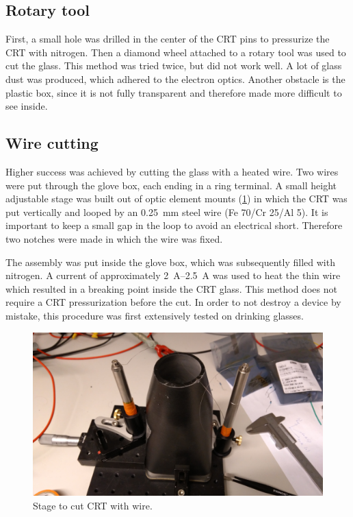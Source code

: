 \subsection{Rotary tool}
\label{subsec:Rotary tool}

First, a small hole was drilled in the center of the CRT pins to pressurize the CRT with nitrogen. Then a diamond wheel attached to a rotary tool was used to cut the glass. This method was tried twice, but did not work well. A lot of glass dust was produced, which adhered to the electron optics. Another obstacle is the plastic box, since it is not fully transparent and therefore made more difficult to see inside. 


\subsection{Wire cutting}
\label{subsec:Wire cutting}

Higher success was achieved by cutting the glass with a heated wire. Two wires were put through the glove box, each ending in a ring terminal. A small height adjustable stage was built out of optic element mounts (\cref{fig:Stage to cut CRT with wire}) in which the CRT was put vertically and looped by an \SI{0.25}{\milli\meter} steel wire (Fe 70/Cr 25/Al 5). It is important to keep a small gap in the loop to avoid an electrical short. Therefore two notches were made in which the wire was fixed.

The assembly was put inside the glove box, which was subsequently filled with nitrogen. A current of approximately \SIrange{2}{2.5}{\ampere} was used to heat the thin wire which resulted in a breaking point inside the CRT glass. This method does not require a CRT pressurization before the cut. In order to not destroy a device by mistake, this procedure was first extensively tested on drinking glasses.

\begin{figure}[ht]
	
	
	\includegraphics[width=.9\textwidth]{Chapters/CRT-handling/Cutting_Stage.jpg}
	\caption{Stage to cut CRT with wire.}
	\label{fig:Stage to cut CRT with wire}
\end{figure}


